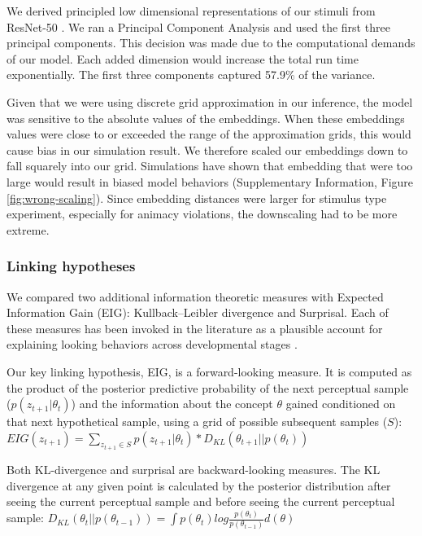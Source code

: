 \documentclass[
]{article}
\begin{document}
We derived principled low dimensional representations of our stimuli from ResNet-50 \autocite{he2016deep}. We ran a Principal Component Analysis and used the first three principal components. This decision was made due to the computational demands of our model. Each added dimension would increase the total run time exponentially. The first three components captured 57.9\% of the variance.

Given that we were using discrete grid approximation in our inference, the model was sensitive to the absolute values of the embeddings. When these embeddings values were close to or exceeded the range of the approximation grids, this would cause bias in our simulation result. We therefore scaled our embeddings down to fall squarely into our grid. Simulations have shown that embedding that were too large would result in biased model behaviors (Supplementary Information, Figure \ref{fig:wrong-scaling}). Since embedding distances were larger for stimulus type experiment, especially for animacy violations, the downscaling had to be more extreme.

\hypertarget{linking-hypotheses}{%
\subsubsection{Linking hypotheses}\label{linking-hypotheses}}

We compared two additional information theoretic measures with Expected Information Gain (EIG): Kullback--Leibler divergence and Surprisal. Each of these measures has been invoked in the literature as a plausible account for explaining looking behaviors across developmental stages \autocites[KL divergence:][]{poli2020infants}[surprisal:][]{kidd2012goldilocks}.

Our key linking hypothesis, EIG, is a forward-looking measure. It is computed as the product of the posterior predictive probability of the next perceptual sample (\(p(z_{t+1}|\theta_t)\)) and the information about the concept \(\theta\) gained conditioned on that next hypothetical sample, using a grid of possible subsequent samples (\(S\)): \(EIG(z_{t+1}) = \sum_{z_{t+1} \in S} p(z_{t+1}|\theta_t) * D_{KL}(\theta_{t+1} || p(\theta_t))\)

Both KL-divergence and surprisal are backward-looking measures. The KL divergence at any given point is calculated by the posterior distribution after seeing the current perceptual sample and before seeing the current perceptual sample: \(D_{KL}(\theta_{t} || p(\theta_{t-1})) = \int {p(\theta_{t}) log \frac{p(\theta_{t})}{p(\theta_{t-1})}} d(\theta)\)
\end{document}
